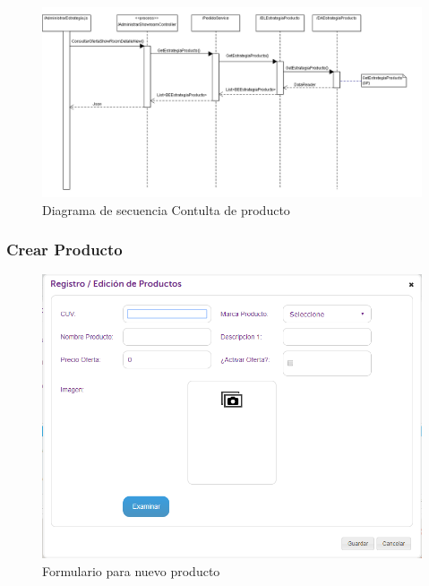 \documentclass[a4paper,11pt]{paper}
\begin{document}
\begin{landscape}
\begin{figure}[!h]
\centering
\includegraphics[width=1.5\textwidth]{imgs/Producto/ConsultarProducto.png}
\caption{Diagrama de secuencia Contulta de producto}
\end{figure}
\end{landscape} 



\newpage
\subsubsection{Crear Producto}

\begin{figure}[h]
\centering
\includegraphics[width=1.0\textwidth]{imgs/Producto/FormularioNuevoProducto.png}
\caption{Formulario para nuevo producto}
\end{figure}
\end{document}

